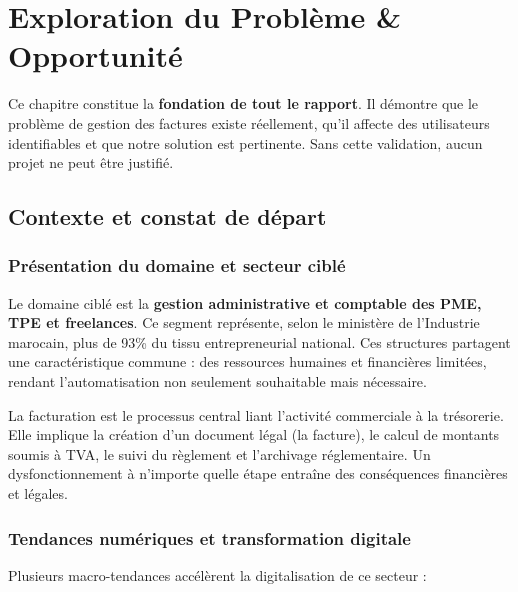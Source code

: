 
\chapter{Exploration du Problème \& Opportunité}

Ce chapitre constitue la \textbf{fondation de tout le rapport}. Il démontre que le problème de gestion des factures existe réellement, qu'il affecte des utilisateurs identifiables et que notre solution est pertinente. Sans cette validation, aucun projet ne peut être justifié.

\section{Contexte et constat de départ}

\subsection{Présentation du domaine et secteur ciblé}

Le domaine ciblé est la \textbf{gestion administrative et comptable des PME, TPE et freelances}. Ce segment représente, selon le ministère de l'Industrie marocain, plus de 93\% du tissu entrepreneurial national. Ces structures partagent une caractéristique commune : des ressources humaines et financières limitées, rendant l'automatisation non seulement souhaitable mais nécessaire.

La facturation est le processus central liant l'activité commerciale à la trésorerie. Elle implique la création d'un document légal (la facture), le calcul de montants soumis à TVA, le suivi du règlement et l'archivage réglementaire. Un dysfonctionnement à n'importe quelle étape entraîne des conséquences financières et légales.

\subsection{Tendances numériques et transformation digitale}

Plusieurs macro-tendances accélèrent la digitalisation de ce secteur :

